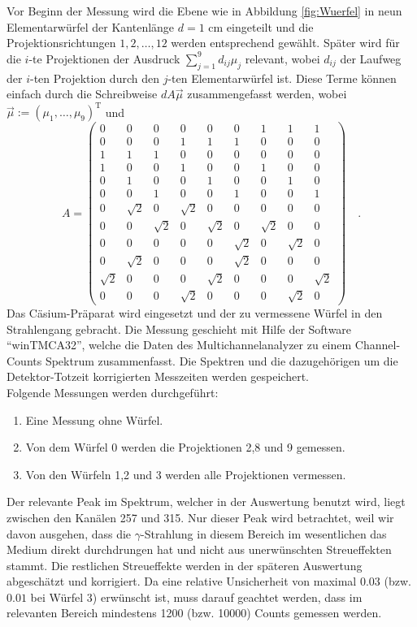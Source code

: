 Vor Beginn der Messung wird die Ebene wie in Abbildung \ref{fig:Wuerfel} in neun Elementarwürfel
der Kantenlänge $d=1$ cm eingeteilt und die Projektionsrichtungen $1,2,\ldots,12$ werden
entsprechend gewählt. Später wird für die $i$-te Projektionen der Ausdruck $\sum_{j=1}^9
d_{ij}\mu_j$  relevant, wobei $d_{ij}$ der Laufweg der $i$-ten Projektion durch den $j$-ten
Elementarwürfel ist. Diese Terme können einfach durch die Schreibweise $d A\vec{\mu}$
zusammengefasst werden, wobei $\vec{\mu}:=(\mu_1,\ldots,\mu_9)^\text{T}$ und
\begin{equation}
A=
\begin{pmatrix}
0	&0	&0	&0	&0	&0	&1	&1	&1	\\
0	&0	&0	&1	&1	&1	&0	&0	&0	\\
1	&1	&1	&0	&0	&0	&0	&0	&0	\\
1	&0	&0	&1	&0	&0	&1	&0	&0	\\
0	&1	&0	&0	&1	&0	&0	&1	&0	\\
0	&0	&1	&0	&0	&1	&0	&0	&1	\\
0	&\sqrt{2}	&0	&\sqrt{2}	&0	&0	&0	&0	&0	\\
0	&0	&\sqrt{2}	&0	&\sqrt{2}	&0	&\sqrt{2}	&0	&0	\\
0	&0	&0	&0	&0	&\sqrt{2}	&0	&\sqrt{2}	&0	\\
0	&\sqrt{2}	&0	&0	&0	&\sqrt{2}	&0	&0	&0	\\
\sqrt{2}	&0	&0	&0	&\sqrt{2}	&0	&0	&0	&\sqrt{2}	\\
0	&0	&0	&\sqrt{2}	&0	&0	&0	&\sqrt{2}	&0
\end{pmatrix} \quad . \label{eq:Matrix}
\end{equation}
Das Cäsium-Präparat wird eingesetzt und der zu vermessene Würfel in den Strahlengang gebracht.
Die Messung geschieht mit Hilfe der Software "`winTMCA32"', welche die Daten des
Multichannelanalyzer zu einem Channel-Counts Spektrum zusammenfasst. Die Spektren und die
dazugehörigen um die Detektor-Totzeit korrigierten Messzeiten werden
gespeichert.\\
Folgende Messungen werden durchgeführt:
\begin{enumerate}
\item Eine Messung ohne Würfel.
\item Von dem Würfel 0 werden die Projektionen 2,8 und 9 gemessen.
\item Von den Würfeln 1,2 und 3 werden alle Projektionen vermessen.
\end{enumerate}
Der relevante Peak im Spektrum, welcher in der Auswertung benutzt wird, liegt zwischen den
Kanälen 257 und 315.
Nur dieser Peak wird betrachtet, weil wir davon ausgehen, dass die
$\gamma$-Strahlung in diesem Bereich im wesentlichen das Medium direkt
durchdrungen hat und nicht aus unerwünschten Streueffekten stammt.
Die restlichen Streueffekte werden in der späteren Auswertung abgeschätzt und
korrigiert.
Da eine relative Unsicherheit von maximal $0.03$ (bzw. $0.01$ bei Würfel 3)
erwünscht ist, muss darauf geachtet werden, dass im relevanten Bereich mindestens 1200 (bzw.
10000) Counts gemessen werden.
